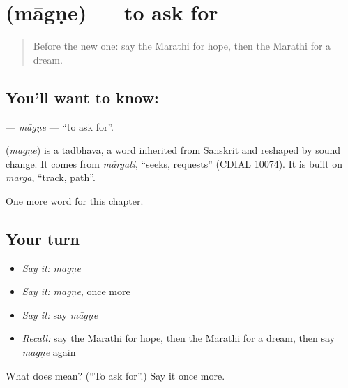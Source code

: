 \section[\texorpdfstring{\mr{मागणे} (māgṇe)}{मागणे (māgṇe)}]{ (māgṇe) — to ask for}

\label{lesson:MR-C123-magne}



\begin{quote}
Before the new one: say the Marathi for hope, then the Marathi for a dream.
\end{quote}

\subsection*{You'll want to know: }
\textbf{} — \emph{māgṇe} — \textquotedblleft{}to ask for\textquotedblright{}.

\begin{cousinweb}
\textbf{} (\emph{māgṇe}) is a tadbhava, a word inherited from Sanskrit and reshaped by sound change. It comes from \emph{mārgati}, \textquotedblleft{}seeks, requests\textquotedblright{} (CDIAL 10074). It is built on \emph{mārga}, \textquotedblleft{}track, path\textquotedblright{}.
\end{cousinweb}

\begin{grammarlens}[title={What you've built}]
One more word for this chapter.
\end{grammarlens}

\subsection*{Your turn}
\begin{itemize}
\raggedright
  \item \emph{Say it:} \emph{māgṇe}
  \item \emph{Say it:} \emph{māgṇe}, once more
  \item \emph{Say it:} say \emph{māgṇe}
  \item \emph{Recall:} say the Marathi for hope, then the Marathi for a dream, then say \emph{māgṇe} again
\end{itemize}

\begin{tcolorbox}[breakable,colback=teal!4,colframe=teal!35!black,title={Before you move on}]
What does  mean? (\textquotedblleft{}To ask for\textquotedblright{}.) Say it once more.
\end{tcolorbox}
